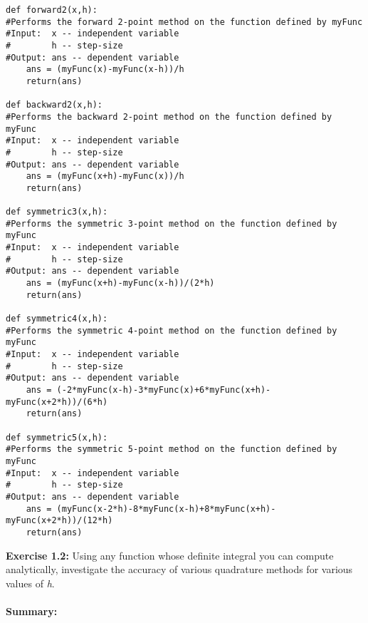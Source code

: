 \documentclass[10pt]{article}
\begin{document}
\begin{lstlisting}
def forward2(x,h):
#Performs the forward 2-point method on the function defined by myFunc
#Input:  x -- independent variable
#        h -- step-size
#Output: ans -- dependent variable
    ans = (myFunc(x)-myFunc(x-h))/h
    return(ans)

def backward2(x,h):
#Performs the backward 2-point method on the function defined by myFunc
#Input:  x -- independent variable
#        h -- step-size
#Output: ans -- dependent variable
    ans = (myFunc(x+h)-myFunc(x))/h
    return(ans)

def symmetric3(x,h):
#Performs the symmetric 3-point method on the function defined by myFunc
#Input:  x -- independent variable
#        h -- step-size
#Output: ans -- dependent variable
    ans = (myFunc(x+h)-myFunc(x-h))/(2*h)
    return(ans)

def symmetric4(x,h):
#Performs the symmetric 4-point method on the function defined by myFunc
#Input:  x -- independent variable
#        h -- step-size
#Output: ans -- dependent variable
    ans = (-2*myFunc(x-h)-3*myFunc(x)+6*myFunc(x+h)-myFunc(x+2*h))/(6*h)
    return(ans)

def symmetric5(x,h):
#Performs the symmetric 5-point method on the function defined by myFunc
#Input:  x -- independent variable
#        h -- step-size
#Output: ans -- dependent variable
    ans = (myFunc(x-2*h)-8*myFunc(x-h)+8*myFunc(x+h)-myFunc(x+2*h))/(12*h)
    return(ans)
\end{lstlisting}
\textbf{Exercise 1.2:} Using any function whose definite integral you can compute analytically, investigate the accuracy of various quadrature methods for various values of \textit{h}. \\
\\
\textbf{Summary:}
\end{document}

